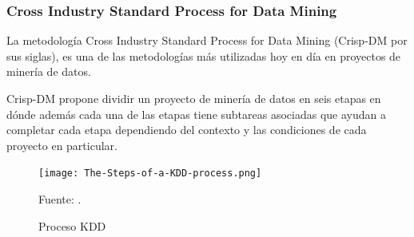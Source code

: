 \subsubsection{Cross Industry Standard Process for Data Mining}
    La metodología Cross Industry Standard Process for Data Mining \cite{wirth2000crisp} (Crisp-DM por sus siglas), es una de las metodologías más utilizadas hoy en día en proyectos de minería de datos. 
    
    Crisp-DM propone dividir un proyecto de minería de datos en seis etapas en dónde además cada una de las etapas tiene subtareas asociadas que ayudan a completar cada etapa dependiendo del contexto y las condiciones de cada proyecto en particular. 
    
    \begin{figure}[H]
    \centering
    \texttt{[image: The-Steps-of-a-KDD-process.png]}
    \caption{\label{fig:KDD} Proceso KDD} Fuente: \cite{fayyad1996kdd}.
\end{figure}
    
